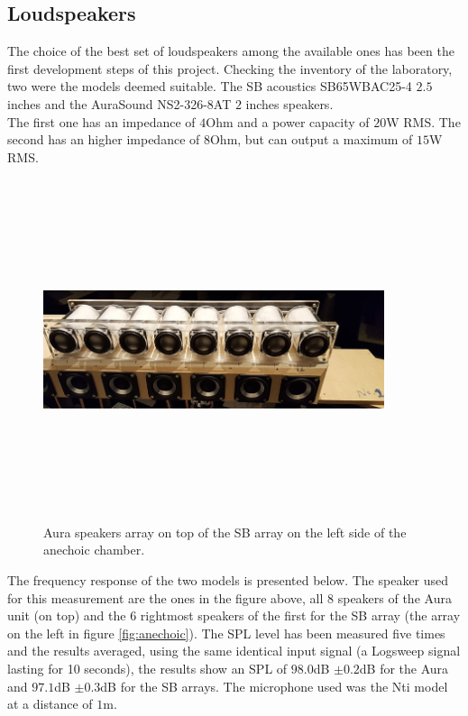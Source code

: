 \subsection{Loudspeakers}{}
\label{subsec:speakers}

The choice of the best set of loudspeakers among the available ones has been the first development steps of this project. Checking the inventory of the laboratory, two were the models deemed suitable. The SB acoustics SB65WBAC25-4 $2.5$ inches and the AuraSound NS2-326-8AT $2$ inches speakers.
\\
The first one has an impedance of $4$Ohm and a power capacity of $20$W RMS. The second has an higher impedance of $8$Ohm, but can output a maximum of $15$W RMS.

\begin{figure}[H]
\centering
\includegraphics[width=10cm,height=10cm,keepaspectratio]{Figures/aurasb1}
\decoRule
\caption[Aura speakers]{Aura speakers array on top of the SB array on the left side of the anechoic chamber.}
\label{fig:aurasbspeakers}
\end{figure}

The frequency response of the two models is presented below. The speaker used for this measurement are the ones in the figure above, all 8 speakers of the Aura unit (on top) and the 6 rightmost speakers of the first for the SB array (the array on the left in figure \ref{fig:anechoic}). The SPL level has been measured five times and the results averaged, using the same identical input signal (a Logsweep signal lasting for 10 seconds), the results show an SPL of $98.0$dB $\pm0.2$dB for the Aura and $97.1$dB $\pm0.3$dB for the SB arrays. The microphone used was the Nti model at a distance of $1$m.

